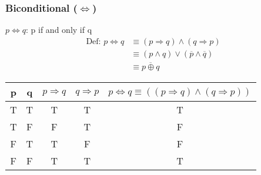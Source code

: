 \documentclass{article}
\begin{document}
\subsubsection{Biconditional ($\iff$)}
$p \iff q$: p if and only if q
\begin{align*}
    \text{Def: }    p \iff q & \equiv (p \Rightarrow q) \land (q \Rightarrow p)          \\
                             & \equiv (p \land q) \lor (\overline{p} \land \overline{q}) \\
                             & \equiv \overline{p \oplus q}
\end{align*}
\begin{table}[h!]
    \begin{center}
        \begin{tabular}{c|c|c|c|c}
            p & q & $p \Rightarrow q$ & $q \Rightarrow p$ & $p \iff q \equiv((p \Rightarrow q) \land (q \Rightarrow p))$ \\
            \hline
            T & T & T                 & T                 & T                                                            \\
            T & F & F                 & T                 & F                                                            \\
            F & T & T                 & F                 & F                                                            \\
            F & F & T                 & T                 & T
        \end{tabular}
    \end{center}
\end{table}
\end{document}
